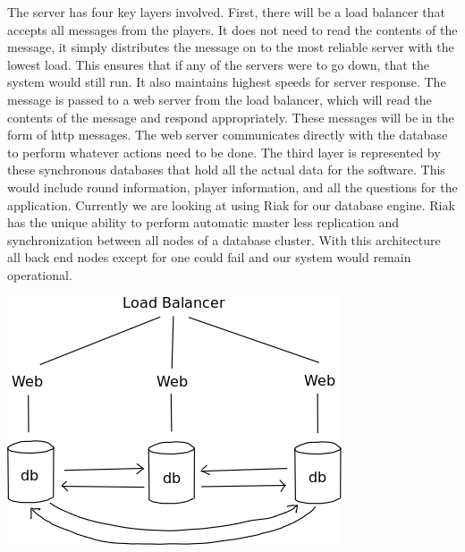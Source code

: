\documentclass{dependencies/acm_proc_article-sp}
\begin{document}
The server has four key layers involved.
First, there will be a load balancer that accepts all messages from the players.
It does not need to read the contents of the message, it simply distributes the message on to the most reliable server with the lowest load.
This ensures that if any of the servers were to go down, that the system would still run.
It also maintains highest speeds for server response.
The message is passed to a web server from the load balancer, which will read the contents of the message and respond appropriately.
These messages will be in the form of http messages.
The web server communicates directly with the database to perform whatever actions need to be done.
The third layer is represented by these synchronous databases that hold all the actual data for the software.
This would include round information, player information, and all the questions for the application.
Currently we are looking at using Riak for our database engine.
Riak has the unique ability to perform automatic master less replication and
synchronization between all nodes of a database cluster. With this architecture 
all back end nodes except for one could fail and our system would remain
operational.
\begin{center}
  \includegraphics[scale=0.35]{design-pictures/database2.png}
\end{center}

\newpage
%
%
%
%
\balancecolumns
\end{document}
